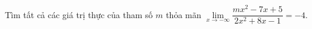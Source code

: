 \begin{ex}
Tìm tất cả các giá trị thực của tham số $m$ thỏa mãn $\lim\limits_{x\to-\infty}\dfrac{mx^2-7x+5}{2x^2+8x-1}=-4$.
\end{ex}
